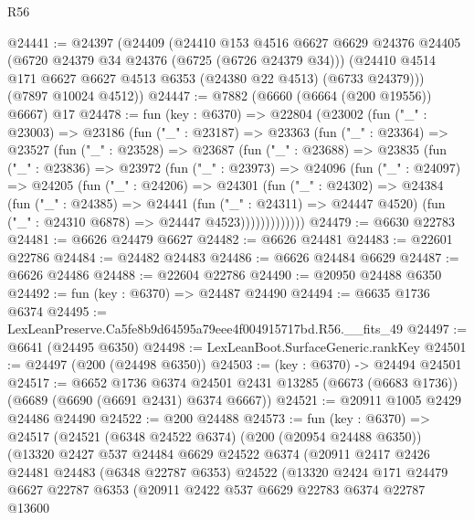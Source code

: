 \begin{lexlean}{R56}
\begin{coremodule}
@24441 := @24397
    (@24409
      (@24410
        @153
        @4516
        @6627
        @6629
        @24376
        @24405
        (@6720 @24379 @34 @24376 (@6725 (@6726 @24379 @34)))
        (@24410 @4514 @171 @6627 @6627 @4513 @6353 (@24380 @22 @4513) (@6733 @24379)))
      (@7897 @10024 @4512))
@24447 := @7882 (@6660 (@6664 (@200 @19556)) @6667) @17
@24478 := fun (key : @6370) =>
  @22804
    (@23002
      (fun ("_" : @23003) =>
      @23186
        (fun ("_" : @23187) =>
        @23363
          (fun ("_" : @23364) =>
          @23527
            (fun ("_" : @23528) =>
            @23687
              (fun ("_" : @23688) =>
              @23835
                (fun ("_" : @23836) =>
                @23972
                  (fun ("_" : @23973) =>
                  @24096
                    (fun ("_" : @24097) =>
                    @24205
                      (fun ("_" : @24206) =>
                      @24301
                        (fun ("_" : @24302) =>
                        @24384
                          (fun ("_" : @24385) =>
                          @24441
                            (fun ("_" : @24311) => @24447 @4520)
                            (fun ("_" : @24310 @6878) => @24447 @4523)))))))))))))
@24479 := @6630 @22783
@24481 := @6626 @24479 @6627
@24482 := @6626 @24481
@24483 := @22601 @22786
@24484 := @24482 @24483
@24486 := @6626 @24484 @6629
@24487 := @6626 @24486
@24488 := @22604 @22786
@24490 := @20950 @24488 @6350
@24492 := fun (key : @6370) => @24487 @24490
@24494 := @6635 @1736 @6374
@24495 := LexLeanPreserve.Ca5fe8b9d64595a79eee4f004915717bd.R56.__fits_49
@24497 := @6641 (@24495 @6350)
@24498 := LexLeanBoot.SurfaceGeneric.rankKey
@24501 := @24497 (@200 (@24498 @6350))
@24503 := (key : @6370) -> @24494 @24501
@24517 := @6652
    @1736
    @6374
    @24501
    @2431
    @13285
    (@6673 (@6683 @1736))
    (@6689 (@6690 (@6691 @2431) @6374 @6667))
@24521 := @20911 @1005 @2429 @24486 @24490
@24522 := @200 @24488
@24573 := fun (key : @6370) =>
  @24517
    (@24521
      (@6348 @24522 @6374)
      (@200 (@20954 @24488 @6350))
      (@13320
        @2427
        @537
        @24484
        @6629
        @24522
        @6374
        (@20911
          @2417
          @2426
          @24481
          @24483
          (@6348 @22787 @6353)
          @24522
          (@13320
            @2424
            @171
            @24479
            @6627
            @22787
            @6353
            (@20911
              @2422
              @537
              @6629
              @22783
              @6374
              @22787
              @13600

\end{coremodule}
\end{lexlean}
